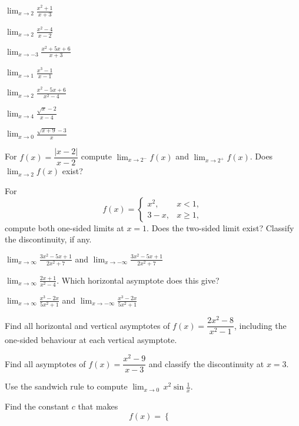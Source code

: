\begin{problems}
  \item $\displaystyle\lim_{x\to 2}\frac{x^{2}+1}{x+3}$
  \item $\displaystyle\lim_{x\to 2}\frac{x^{2}-4}{x-2}$
  \item $\displaystyle\lim_{x\to -3}\frac{x^{2}+5x+6}{x+3}$
  \item $\displaystyle\lim_{x\to 1}\frac{x^{3}-1}{x-1}$
  \item $\displaystyle\lim_{x\to 2}\frac{x^{2}-5x+6}{x^{2}-4}$
  \item $\displaystyle\lim_{x\to 4}\frac{\sqrt{x}-2}{x-4}$
  \item $\displaystyle\lim_{x\to 0}\frac{\sqrt{x+9}-3}{x}$
  \item For $f(x)=\dfrac{|x-2|}{x-2}$ compute
        $\displaystyle\lim_{x\to 2^{-}}f(x)$ and
        $\displaystyle\lim_{x\to 2^{+}}f(x)$. Does
        $\displaystyle\lim_{x\to 2}f(x)$ exist?
  \item For
        \[
          f(x)=
          \begin{cases}
            x^{2}, & x<1,\\
            3-x,   & x\ge 1,
          \end{cases}
        \]
        compute both one-sided limits at $x=1$. Does the two-sided limit
        exist? Classify the discontinuity, if any.
  \item $\displaystyle\lim_{x\to\infty}\frac{3x^{2}-5x+1}{2x^{2}+7}$
        \quad and \quad
        $\displaystyle\lim_{x\to-\infty}\frac{3x^{2}-5x+1}{2x^{2}+7}$
  \item $\displaystyle\lim_{x\to\infty}\frac{2x+1}{x^{2}-4}$. Which
        horizontal asymptote does this give?
  \item $\displaystyle\lim_{x\to\infty}\frac{x^{3}-2x}{5x^{2}+1}$
        \quad and \quad
        $\displaystyle\lim_{x\to-\infty}\frac{x^{3}-2x}{5x^{2}+1}$
  \item Find all horizontal and vertical asymptotes of
        $f(x)=\dfrac{2x^{2}-8}{x^{2}-1}$, including the one-sided
        behaviour at each vertical asymptote.
  \item Find all asymptotes of $f(x)=\dfrac{x^{2}-9}{x-3}$ and classify
        the discontinuity at $x=3$.
  \item Use the sandwich rule to compute
        $\displaystyle\lim_{x\to 0}\,x^{2}\sin\frac{1}{x}$.
  \item Find the constant $c$ that makes
        \[
          f(x)=
          \begin{cases}

\end{cases}\]
\end{problems}
